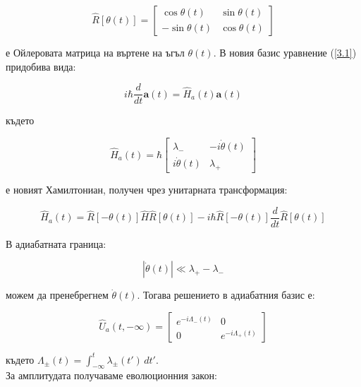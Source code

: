     \begin{equation} \label{3.5}
        \hat{R}[\theta(t)] =
        \begin{bmatrix}
            \cos\theta (t) & \sin\theta (t)\\
            -\sin\theta (t) & \cos\theta (t)
        \end{bmatrix}
    \end{equation}

    е Ойлеровата матрица на въртене на ъгъл $\theta(t)$. В новия базис уравнение (\ref{3.1}) придобива вида:

    \begin{equation}
        i\hbar \frac{d}{dt}\mathbf{a}(t) = \hat{H}_a(t)\mathbf{a}(t)
    \end{equation}

    където

    \begin{equation}
        \hat{H}_a(t) = \hbar
        \begin{bmatrix}
            \lambda_- & -i\dot{\theta} (t)\\
            i\dot{\theta} (t) & \lambda_+
        \end{bmatrix}
    \end{equation}
    
    е новият Хамилтониан, получен чрез унитарната трансформация:

    \begin{equation}
        \hat{H}_a(t) = \hat{R}[-\theta (t)]\hat{H}\hat{R}[\theta (t)] - i\hbar\hat{R}[-\theta (t)]\frac{d}{dt}\hat{R}[\theta (t)]
    \end{equation}

    В адиабатната граница:

    \begin{equation}
        \left\lvert \dot{\theta}(t)\right\rvert \ll  \lambda_+ - \lambda_-
    \end{equation}

    можем да пренебрегнем $\dot{\theta}(t)$. Тогава решението в адиабатния базис е:

    \begin{equation}
        \hat{U}_a (t,-\infty) =
        \begin{bmatrix}
            e^{-i\Lambda_-(t)} & 0 \\
            0 & e^{-i\Lambda_+(t)}
        \end{bmatrix}
    \end{equation}

    където $\Lambda_{\pm}(t) = \int_{-\infty}^{t} \lambda_{\pm}(t') \,dt' $.\\
    За амплитудата получаваме еволюционния закон:

